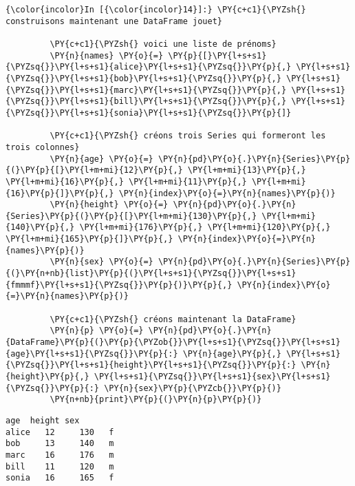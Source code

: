     \begin{Verbatim}[commandchars=\\\{\}]
{\color{incolor}In [{\color{incolor}14}]:} \PY{c+c1}{\PYZsh{} construisons maintenant une DataFrame jouet}
         
         \PY{c+c1}{\PYZsh{} voici une liste de prénoms}
         \PY{n}{names} \PY{o}{=} \PY{p}{[}\PY{l+s+s1}{\PYZsq{}}\PY{l+s+s1}{alice}\PY{l+s+s1}{\PYZsq{}}\PY{p}{,} \PY{l+s+s1}{\PYZsq{}}\PY{l+s+s1}{bob}\PY{l+s+s1}{\PYZsq{}}\PY{p}{,} \PY{l+s+s1}{\PYZsq{}}\PY{l+s+s1}{marc}\PY{l+s+s1}{\PYZsq{}}\PY{p}{,} \PY{l+s+s1}{\PYZsq{}}\PY{l+s+s1}{bill}\PY{l+s+s1}{\PYZsq{}}\PY{p}{,} \PY{l+s+s1}{\PYZsq{}}\PY{l+s+s1}{sonia}\PY{l+s+s1}{\PYZsq{}}\PY{p}{]}
         
         \PY{c+c1}{\PYZsh{} créons trois Series qui formeront les trois colonnes}
         \PY{n}{age} \PY{o}{=} \PY{n}{pd}\PY{o}{.}\PY{n}{Series}\PY{p}{(}\PY{p}{[}\PY{l+m+mi}{12}\PY{p}{,} \PY{l+m+mi}{13}\PY{p}{,} \PY{l+m+mi}{16}\PY{p}{,} \PY{l+m+mi}{11}\PY{p}{,} \PY{l+m+mi}{16}\PY{p}{]}\PY{p}{,} \PY{n}{index}\PY{o}{=}\PY{n}{names}\PY{p}{)}
         \PY{n}{height} \PY{o}{=} \PY{n}{pd}\PY{o}{.}\PY{n}{Series}\PY{p}{(}\PY{p}{[}\PY{l+m+mi}{130}\PY{p}{,} \PY{l+m+mi}{140}\PY{p}{,} \PY{l+m+mi}{176}\PY{p}{,} \PY{l+m+mi}{120}\PY{p}{,} \PY{l+m+mi}{165}\PY{p}{]}\PY{p}{,} \PY{n}{index}\PY{o}{=}\PY{n}{names}\PY{p}{)}
         \PY{n}{sex} \PY{o}{=} \PY{n}{pd}\PY{o}{.}\PY{n}{Series}\PY{p}{(}\PY{n+nb}{list}\PY{p}{(}\PY{l+s+s1}{\PYZsq{}}\PY{l+s+s1}{fmmmf}\PY{l+s+s1}{\PYZsq{}}\PY{p}{)}\PY{p}{,} \PY{n}{index}\PY{o}{=}\PY{n}{names}\PY{p}{)}
         
         \PY{c+c1}{\PYZsh{} créons maintenant la DataFrame}
         \PY{n}{p} \PY{o}{=} \PY{n}{pd}\PY{o}{.}\PY{n}{DataFrame}\PY{p}{(}\PY{p}{\PYZob{}}\PY{l+s+s1}{\PYZsq{}}\PY{l+s+s1}{age}\PY{l+s+s1}{\PYZsq{}}\PY{p}{:} \PY{n}{age}\PY{p}{,} \PY{l+s+s1}{\PYZsq{}}\PY{l+s+s1}{height}\PY{l+s+s1}{\PYZsq{}}\PY{p}{:} \PY{n}{height}\PY{p}{,} \PY{l+s+s1}{\PYZsq{}}\PY{l+s+s1}{sex}\PY{l+s+s1}{\PYZsq{}}\PY{p}{:} \PY{n}{sex}\PY{p}{\PYZcb{}}\PY{p}{)}
         \PY{n+nb}{print}\PY{p}{(}\PY{n}{p}\PY{p}{)}
\end{Verbatim}


    \begin{Verbatim}[commandchars=\\\{\}]
       age  height sex
alice   12     130   f
bob     13     140   m
marc    16     176   m
bill    11     120   m
sonia   16     165   f

    \end{Verbatim}

